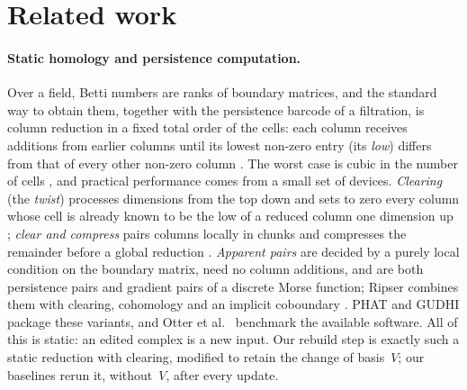 \section{Related work}\label{sec:related}

\paragraph{Static homology and persistence computation.}
Over a field, Betti numbers are ranks of boundary matrices, and the standard
way to obtain them, together with the persistence barcode of a filtration, is
column reduction in a fixed total order of the cells: each column receives
additions from earlier columns until its lowest non-zero entry (its
\emph{low}) differs from that of every other non-zero column
\cite{edelsbrunner2002topological,zomorodian2005computing,edelsbrunner2010computational}.
The worst case is cubic in the number of cells
\cite{edelsbrunner2010computational}, and practical performance comes from a
small set of devices. \emph{Clearing} (the \emph{twist}) processes dimensions
from the top down and sets to zero every column whose cell is already known to
be the low of a reduced column one dimension up \cite{chen2011twist};
\emph{clear and compress} pairs columns locally in chunks and compresses the
remainder before a global reduction \cite{bauer2014clear}. \emph{Apparent
pairs} are decided by a purely local condition on the boundary matrix, need no
column additions, and are both persistence pairs and gradient pairs of a
discrete Morse function; Ripser combines them with clearing, cohomology and an
implicit coboundary \cite{bauer2021ripser}. PHAT \cite{bauer2017phat} and
GUDHI \cite{maria2014gudhi} package these variants, and Otter et
al.~\cite{otter2017roadmap} benchmark the available software. All of this is
static: an edited complex is a new input. Our rebuild step is exactly such a
static reduction with clearing, modified to retain the change of basis~$V$;
our  baselines rerun it, without~$V$, after every update.

